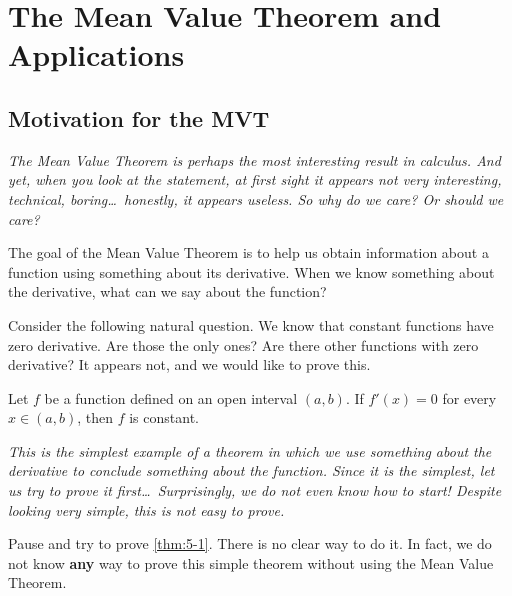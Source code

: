 \chapter{The Mean Value Theorem and Applications}

\section{Motivation for the MVT}
\label{sec:5.1}

\textit{The Mean Value Theorem is perhaps the most interesting result in calculus.  And yet, when you look at the statement, at first sight it appears not very interesting, technical, boring\dots\ honestly, it appears useless.  So why do we care?  Or should we care?}

The goal of the Mean Value Theorem is to help us obtain information about a function using something about its derivative.  When we know something about the derivative, what can we say about the function?

Consider the following natural question.  We know that constant functions have zero derivative.  Are those the only ones?  Are there other functions with zero derivative?  It appears not, and we would like to prove this.

\begin{theorem}
\label{thm:5-1}
Let $f$ be a function defined on an open interval $(a,b)$.  If $f'(x) = 0$ for every $x \in (a,b)$, then $f$ is constant.
\end{theorem}

\textit{This is the simplest example of a theorem in which we use something about the derivative to conclude something about the function.  Since it is the simplest, let us try to prove it first\ldots\ Surprisingly, we do not even know how to start!  Despite looking very simple, this is not easy to prove.}

\begin{remark}
Pause and try to prove \cref{thm:5-1}.  There is no clear way to do it.  In fact, we do not know \textbf{any} way to prove this simple theorem without using the Mean Value Theorem.
\end{remark}

